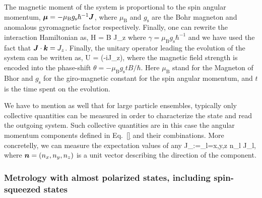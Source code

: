 The magnetic moment of the system is proportional to the spin angular momentum, $\boldsymbol{\mu}=-\mu_\text{B} g_{\text{s}}\hbar^{-1} \boldsymbol{J}$, where $\mu_{\text{B}}$ and $g_{\text{s}}$ are the Bohr magneton and anomalous gyromagnetic factor respectively.
Finally, one can rewrite the interaction Hamiltonian as,
\be
  \label{eq:bg-hamiltonian-homogeneous-field}
  H = \gamma B J_z
\ee
where $\gamma = \mu_\text{B} g_{\text{s}}\hbar^{-1}$ and we have used the fact that $\boldsymbol{J}\cdot\boldsymbol{k}=J_z$.
Finally, the unitary operator leading the evolution of the system can be written as,
\be
  \label{eq:bg-unitary-homogeneous-field}
  U = \exp(-i\theta J_z),
\ee
where the magnetic field strength is encoded into the phase-shift $\theta=-\mu_\text{B} g_\text{s} t B/\hbar$.
Here $\mu_\text{B}$ stand for the Magneton of Bhor and $g_\text{s}$ for the giro-magnetic constant for the spin angular momentum, and $t$ is the time spent on the evolution.

We have to mention as well that for large particle ensembles, typically only collective quantities can be measured in order to characterize the state and read the outgoing system.
Such collective quantities are in this case the angular momentum components defined in Eq.~\eqref{} and their combinations.
More concretelly, we can measure the expectation values of any
\be
  J_{}:=\sum_{l=x,y,z} n_l J_l,
\ee
where $\boldsymbol{n}=(n_x,n_y,n_z)$ is a unit vector describing the direction of the component.

\subsubsection[Metrology with almost polarized states]{Metrology with almost polarized states, including spin-squeezed states}

